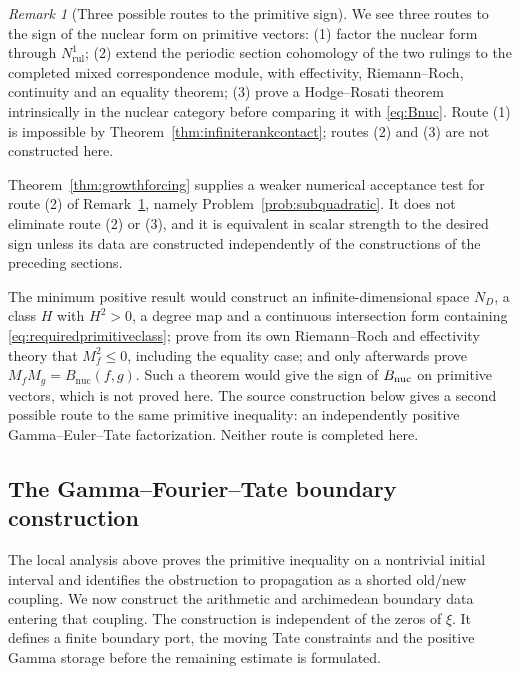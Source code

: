 \documentclass[11pt]{amsart}
\theoremstyle{definition}
\theoremstyle{remark}
\newtheorem{remark}[theorem]{Remark}
\begin{document}
\begin{remark}[Three possible routes to the primitive sign]
\label{thm:rowdtrilemma}
We see three routes to the sign of the nuclear form on primitive vectors:
(1) factor the nuclear form through $N^1_{\mathrm{rul}}$; (2) extend the
periodic section cohomology of the two rulings to the completed mixed
correspondence module, with effectivity, Riemann--Roch, continuity and an
equality theorem; (3) prove a Hodge--Rosati theorem intrinsically in the
nuclear category before comparing it with \eqref{eq:Bnuc}.  Route (1) is
impossible by Theorem~\ref{thm:infiniterankcontact}; routes (2) and (3) are
not constructed here.
\end{remark}

Theorem~\ref{thm:growthforcing} supplies a weaker numerical acceptance test
for route (2) of Remark~\ref{thm:rowdtrilemma}, namely
Problem~\ref{prob:subquadratic}.  It does not eliminate route (2) or (3), and
it is equivalent in scalar strength to the desired sign unless its data are
constructed independently of the constructions of the preceding sections.

The minimum positive result would construct an infinite-dimensional space
$N_D$, a class $H$ with $H^2>0$, a degree map and a continuous intersection
form containing \eqref{eq:requiredprimitiveclass}; prove from its own
Riemann--Roch and effectivity theory that $M_f^2\le0$, including the equality
case; and only afterwards prove $M_fM_g=B_{\mathrm{nuc}}(f,g)$.  Such a theorem would give the sign of $B_{\rm nuc}$ on primitive vectors,
which is not proved here.  The source construction below gives a
second possible route to the same primitive inequality: an independently
positive Gamma--Euler--Tate factorization.  Neither route is completed here.


\subsection{The Gamma--Fourier--Tate boundary construction}
\label{ss:gammafouriertate}

The local analysis above proves the primitive inequality on a nontrivial
initial interval and identifies the obstruction to propagation as a shorted
old/new coupling.  We now construct the arithmetic and archimedean boundary
data entering that coupling.  The construction is independent of the zeros
of $\xi$.  It defines a finite boundary port, the moving Tate constraints and the
positive Gamma storage before the remaining estimate is formulated.
\end{document}
